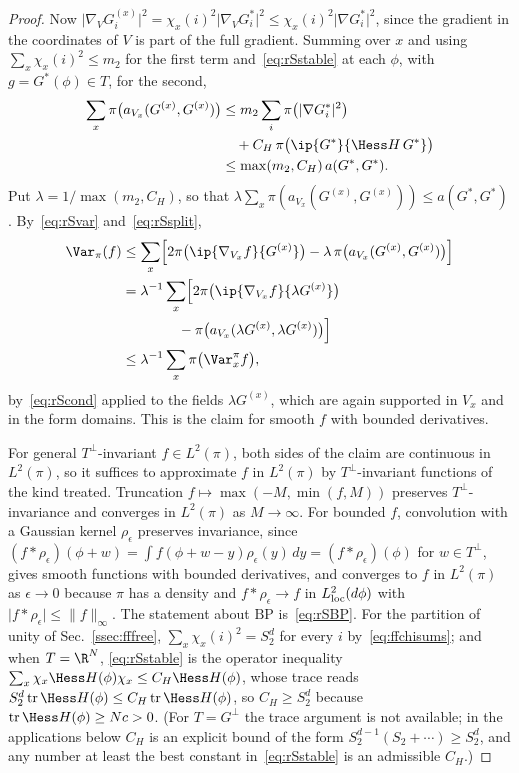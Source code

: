 \begin{proof}
Now $\lvert\nabla_VG^{(x)}_i\rvert^2=\chi_x(i)^2\lvert\nabla_VG^*_i\rvert^2
\le\chi_x(i)^2\lvert\nabla G^*_i\rvert^2$, since the gradient in the
coordinates of $V$ is part of the full gradient. Summing over $x$ and using
$\sum_x\chi_x(i)^2\le m_2$ for the first term and~\eqref{eq:rSstable} at
each $\phi$, with $g=G^*(\phi)\in T$, for the second,
\begin{align*}
\sum_x\pi\bigl(a_{V_x}(G^{(x)},G^{(x)})\bigr)&\le m_2\sum_i\pi\bigl(\lvert\nabla
G^*_i\rvert^2\bigr)\\
&\quad+C_H\,\pi\bigl(\ip{G^*}{\Hess H\,G^*}\bigr)\\
&\le\max(m_2,C_H)\,a(G^*,G^*).
\end{align*}
Put $\lambda=1/\max(m_2,C_H)$, so that $\lambda\sum_x\pi(a_{V_x}(G^{(x)},
G^{(x)}))\le a(G^*,G^*)$. By~\eqref{eq:rSvar} and~\eqref{eq:rSsplit},
\begin{align*}
\Var_\pi(f)&\le\sum_x\Bigl[2\pi\bigl(\ip{\nabla_{V_x}f}{G^{(x)}}\bigr)-
\lambda\,\pi\bigl(a_{V_x}(G^{(x)},G^{(x)})\bigr)\Bigr]\\
&=\lambda^{-1}\sum_x\Bigl[2\pi\bigl(\ip{\nabla_{V_x}f}{\lambda G^{(x)}}
\bigr)\\
&\qquad\qquad-\pi\bigl(a_{V_x}(\lambda G^{(x)},\lambda G^{(x)})\bigr)\Bigr]\\
&\le\lambda^{-1}\sum_x\pi\bigl(\Var^\pi_xf\bigr),
\end{align*}
by~\eqref{eq:rScond} applied to the fields $\lambda G^{(x)}$, which are
again supported in $V_x$ and in the form domains. This is the claim for
smooth $f$ with bounded derivatives.

For general $T^\perp$-invariant $f\in L^2(\pi)$, both sides of the claim are
continuous in $L^2(\pi)$, so it suffices to approximate $f$ in $L^2(\pi)$ by
$T^\perp$-invariant functions of the kind treated. Truncation $f\mapsto\max
(-M,\min(f,M))$ preserves $T^\perp$-invariance and converges in $L^2(\pi)$
as $M\to\infty$. For bounded $f$, convolution with a Gaussian kernel
$\rho_\epsilon$ preserves invariance, since $(f*\rho_\epsilon)(\phi+w)=\int
f(\phi+w-y)\rho_\epsilon(y)\,dy=(f*\rho_\epsilon)(\phi)$ for $w\in T^\perp$,
gives smooth functions with bounded derivatives, and converges to $f$ in
$L^2(\pi)$ as $\epsilon\to0$ because $\pi$ has a density and $f*\rho_\epsilon
\to f$ in $L^2_{\rm loc}(d\phi)$ with $\lvert f*\rho_\epsilon\rvert\le\lVert
f\rVert_\infty$. The statement about $\mathrm{BP}$ is~\eqref{eq:rSBP}. For the partition
of unity of Sec.~\ref{ssec:fffree}, $\sum_x\chi_x(i)^2=S_2^d$ for every $i$
by~\eqref{eq:ffchisums}; and when $T=\R^N$, \eqref{eq:rSstable} is the
operator inequality $\sum_x\chi_x\Hess H(\phi)\chi_x\le C_H\Hess H(\phi)$,
whose trace reads $S_2^d\operatorname{tr}\Hess H(\phi)\le C_H\operatorname{tr}
\Hess H(\phi)$, so $C_H\ge S_2^d$ because $\operatorname{tr}\Hess H(\phi)
\ge Nc>0$. (For $T=G^\perp$ the trace argument is not available; in the
applications below $C_H$ is an explicit bound of the form $S_2^{d-1}(S_2+
\cdots)\ge S_2^d$, and any number at least the best constant
in~\eqref{eq:rSstable} is an admissible $C_H$.)
\end{proof}


